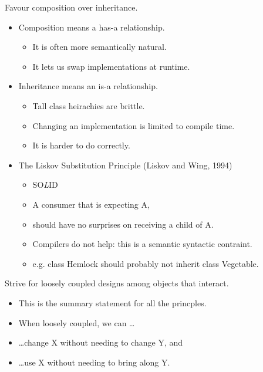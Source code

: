 \documentclass{beamer}
\begin{document}
\begin{frame}{Favour composition over inheritance.}
    \begin{itemize}
        \item Composition means a has-a relationship.
            \begin{itemize}
                \item It is often more semantically natural.
                \item It lets us swap implementations at runtime.
            \end{itemize}
        \item Inheritance means an is-a relationship.
            \begin{itemize}
                \item Tall class heirachies are brittle.
                \item Changing an implementation is limited to compile time.
                \item It is harder to do correctly.
            \end{itemize}
        \item The Liskov Substitution Principle (Liskov and Wing, 1994)
            \begin{itemize}
                \item SO\emph{L}ID %
                \item A consumer that is expecting A, 
                \item should have no surprises on receiving a child of A.
                \item Compilers do not help: this is a semantic syntactic contraint.
                \item e.g. class Hemlock should probably not inherit class Vegetable.
            \end{itemize}
    \end{itemize}
\end{frame}

\begin{frame}{Strive for loosely coupled designs among objects that interact.}
    \begin{itemize}
        \item This is the summary statement for all the princples.
        \item When loosely coupled, we can \ldots
        \item \ldots change X without needing to change Y, and
        \item \ldots use X without needing to bring along Y.
    \end{itemize}
\end{frame}
\end{document}
